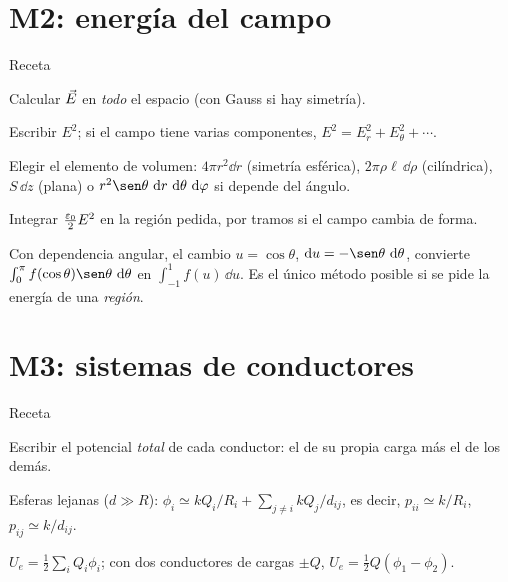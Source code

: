 \section{M2: energía del campo}\label{gsec:m2}

\begin{metodo}{Receta}
\begin{pasos}
  \item Calcular $\vec E$ en \emph{todo} el espacio (con Gauss si hay simetría).
  \item Escribir $E^2$; si el campo tiene varias componentes, $E^2=E_r^2+E_\theta^2+\cdots$.
  \item Elegir el elemento de volumen: $4\pi r^2\dd r$ (simetría esférica), $2\pi\rho\ell\,\dd\rho$ (cilíndrica), $S\,\dd z$ (plana) o
        $r^2\sen\theta\,\dd r\,\dd\theta\,\dd\varphi$ si depende del ángulo.
  \item Integrar $\frac{\varepsilon_0}{2}E^2$ en la región pedida, por tramos si el campo cambia de forma.
\end{pasos}
\end{metodo}

\begin{consejo}
Con dependencia angular, el cambio $u=\cos\theta$, $\dd u=-\sen\theta\,\dd\theta$, convierte $\int_0^\pi f(\cos\theta)\sen\theta\,\dd\theta$ en $\int_{-1}^1f(u)\,\dd u$.
Es el único método posible si se pide la energía de una \emph{región}.
\end{consejo}

\section{M3: sistemas de conductores}\label{gsec:m3}

\begin{metodo}{Receta}
\begin{pasos}
  \item Escribir el potencial \emph{total} de cada conductor: el de su propia carga más el de los demás.
  \item Esferas lejanas ($d\gg R$): $\phi_i\simeq kQ_i/R_i+\sum_{j\neq i}kQ_j/d_{ij}$, es decir, $p_{ii}\simeq k/R_i$, $p_{ij}\simeq k/d_{ij}$.
  \item $U_e=\frac12\sum_iQ_i\phi_i$; con dos conductores de cargas $\pm Q$, $U_e=\frac12Q(\phi_1-\phi_2)$.
\end{pasos}
\end{metodo}

